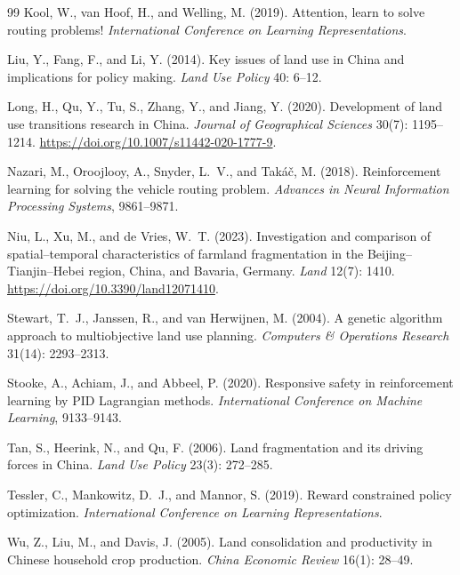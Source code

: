 \documentclass[]{interact}
\theoremstyle{plain}
\begin{document}
\begin{thebibliography}{99}
Kool, W., van Hoof, H., and Welling, M. (2019).
Attention, learn to solve routing problems!
\textit{International Conference on Learning Representations}.

Liu, Y., Fang, F., and Li, Y. (2014).
Key issues of land use in China and implications for policy making.
\textit{Land Use Policy} 40: 6--12.

Long, H., Qu, Y., Tu, S., Zhang, Y., and Jiang, Y. (2020).
Development of land use transitions research in {China}.
\textit{Journal of Geographical Sciences} 30(7): 1195--1214.
\url{https://doi.org/10.1007/s11442-020-1777-9}.

Nazari, M., Oroojlooy, A., Snyder, L.~V., and Tak\'{a}\v{c}, M. (2018).
Reinforcement learning for solving the vehicle routing problem.
\textit{Advances in Neural Information Processing Systems}, 9861--9871.

Niu, L., Xu, M., and de Vries, W.~T. (2023).
Investigation and comparison of spatial--temporal characteristics of farmland fragmentation in the {Beijing}--{Tianjin}--{Hebei} region, {China}, and {Bavaria}, {Germany}.
\textit{Land} 12(7): 1410.
\url{https://doi.org/10.3390/land12071410}.

Stewart, T.~J., Janssen, R., and van Herwijnen, M. (2004).
A genetic algorithm approach to multiobjective land use planning.
\textit{Computers \& Operations Research} 31(14): 2293--2313.

Stooke, A., Achiam, J., and Abbeel, P. (2020).
Responsive safety in reinforcement learning by PID Lagrangian methods.
\textit{International Conference on Machine Learning}, 9133--9143.

Tan, S., Heerink, N., and Qu, F. (2006).
Land fragmentation and its driving forces in China.
\textit{Land Use Policy} 23(3): 272--285.

Tessler, C., Mankowitz, D.~J., and Mannor, S. (2019).
Reward constrained policy optimization.
\textit{International Conference on Learning Representations}.

Wu, Z., Liu, M., and Davis, J. (2005).
Land consolidation and productivity in Chinese household crop production.
\textit{China Economic Review} 16(1): 28--49.


\end{thebibliography}
\end{document}
